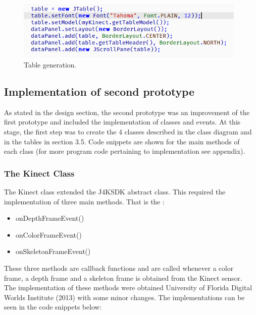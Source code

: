 \documentclass[a4paper, 12pt]{article}
\begin{document}
\begin{figure}[!htb]
	\begin{center}
  \includegraphics[scale=0.7]{codesnippet4.png}
  	\caption{ Table generation.}
  \end{center} 
  \label{fig: codesnippet4} 
\end{figure}

\subsection{Implementation of second prototype}

As stated in the design section, the second prototype was an improvement of the first prototype and included the implementation of classes and events. At this stage, the first step was to create the 4 classes described in the class diagram and in the tables in section 3.5. Code snippets are shown for the main methods of each class (for more program code pertaining to implementation see appendix).

\subsubsection{The Kinect Class}

The Kinect class extended the J4KSDK abstract class. This required the implementation of three main methods. That is the : 

\begin{itemize}
 \item onDepthFrameEvent()
 \item onColorFrameEvent()
 \item onSkeletonFrameEvent()
\end{itemize}  

These three methods are callback functions and are called whenever a color frame, a depth frame and a skeleton frame is obtained from the Kinect sensor. The implementation of these methods were obtained University of Florida Digital Worlds Institute (2013) with some minor changes. The implementations can be seen in the code snippets below: 
\end{document}
